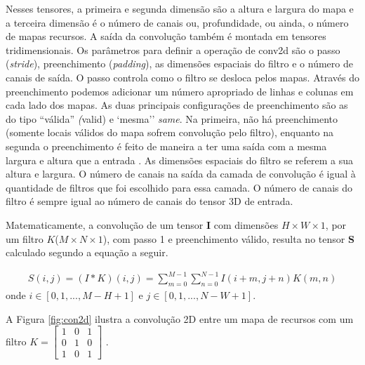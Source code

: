 Nesses tensores, a primeira e segunda dimensão são a altura e largura do mapa e a terceira dimensão é o número de canais ou, profundidade, ou ainda, o número de mapas recursos. A saída da convolução também é montada em tensores tridimensionais.
Os parâmetros para definir a operação de \acrshort{conv2d} são o passo (\textit{stride}), preenchimento (\textit{padding}), as dimensões espaciais do filtro e o número de canais de saída. O passo controla como o filtro se desloca pelos mapas. 
Através do preenchimento podemos adicionar um número apropriado de linhas e colunas em cada lado dos mapas. 
As duas principais configurações de preenchimento são as do tipo ``válida'' \textit(valid) e `mesma'' \textit{same}. Na primeira, não há preenchimento (somente locais válidos do mapa sofrem convolução pelo filtro), enquanto na segunda o preenchimento é feito de maneira a ter uma saída com a mesma largura e altura que a entrada \cite{FrancoisDeepLearning}. 
As dimensões espaciais do filtro se referem a sua altura e largura. O número de canais na saída da camada de convolução é igual à quantidade de filtros que foi escolhido para essa camada. O número de canais do filtro é sempre igual ao número de canais do tensor 3D de entrada. 

Matematicamente, a convolução de um tensor \textbf{I} com dimensões $H \times W \times 1$, por um filtro $K$($M \times N \times 1$), com passo 1 e  preenchimento válido, resulta no tensor \textbf{S} calculado segundo a equação a seguir. 

\begin{equation}
\label{eq:conv2d}
\begin{aligned}
S(i,j) = (I*K)(i,j)=  \sum_{m=0}^{M-1}\sum_{n=0}^{N-1}I(i+m,j+n)K(m,n) 
\end{aligned}
\end{equation}
onde $i \in [0,1,..., M-H+1]$ e $j \in [0,1,..., N-W+1]$. 

A Figura \ref{fig:con2d} ilustra a convolução 2D entre um mapa de recursos com um filtro $K = \begin{bmatrix}
1 &  0& 1\\ 
0 &  1& 0\\ 
1 &  0& 1
\end{bmatrix}$ .



